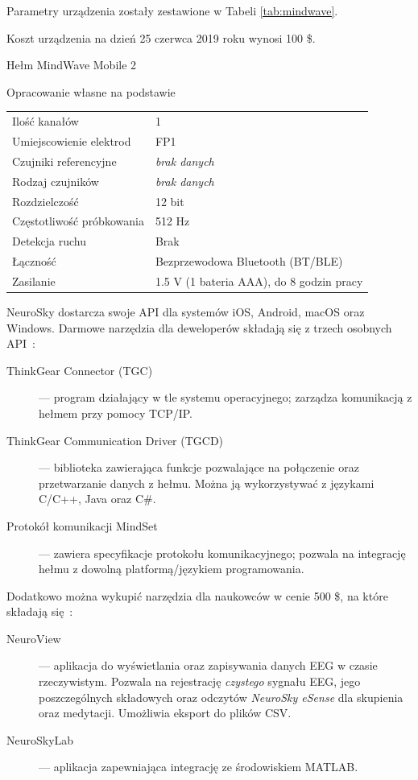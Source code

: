 \documentclass[skorowidz,skroty]{dyplomWEZUT}
\begin{document}
Parametry urządzenia zostały zestawione w Tabeli \vref{tab:mindwave}.

Koszt urządzenia na dzień 25 czerwca 2019 roku wynosi 100 \$.

{Hełm MindWave Mobile 2\label{fig:mindwave}}
{\cite{mindwave}}

{Opracowanie własne na podstawie~\cite{mindwave}}
{
    \begin{tabular}{l|l}
        Ilość kanałów & 1\\
        Umiejscowienie elektrod & FP1\\
        Czujniki referencyjne & \textit{brak danych}\\
        Rodzaj czujników & \textit{brak danych}\\
        Rozdzielczość & 12 bit\\
        Częstotliwość próbkowania & 512 Hz\\
        Detekcja ruchu & Brak\\
        Łączność & Bezprzewodowa Bluetooth (BT/BLE)\\
        Zasilanie & 1.5 V (1 bateria AAA), do 8 godzin pracy
    \end{tabular}
}

NeuroSky dostarcza swoje API dla systemów iOS, Android, macOS oraz Windows. Darmowe narzędzia dla deweloperów składają się z trzech osobnych API~\cite{mindwave_software}:

\begin{description}
    \item [ThinkGear Connector (TGC)] --- program działający w tle systemu operacyjnego; zarządza komunikacją z hełmem przy pomocy TCP/IP.
    \item [ThinkGear Communication Driver (TGCD)] --- biblioteka zawierająca funkcje pozwalające na połączenie oraz przetwarzanie danych z hełmu. Można ją wykorzystywać z językami C/C++, Java oraz C\#.
    \item [Protokół komunikacji MindSet] --- zawiera specyfikacje protokołu komunikacyjnego; pozwala na integrację hełmu z dowolną platformą/językiem programowania.
\end{description}

Dodatkowo można wykupić narzędzia dla naukowców w cenie 500 \$, na które składają się~\cite{mindwave_research}:

\begin{description}
    \item [NeuroView] --- aplikacja do wyświetlania oraz zapisywania danych EEG w czasie rzeczywistym. Pozwala na rejestrację \textit{czystego} sygnału EEG, jego poszczególnych składowych oraz odczytów \textit{NeuroSky eSense} dla skupienia oraz medytacji. Umożliwia eksport do plików CSV.
    \item [NeuroSkyLab] --- aplikacja zapewniająca integrację ze środowiskiem MATLAB.
\end{description}
\end{document}
